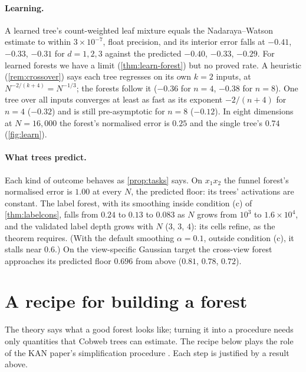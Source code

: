 \paragraph{Learning.}
A learned tree's count-weighted leaf mixture equals the Nadaraya--Watson
estimate to within $3\times10^{-7}$, float precision, and its interior error falls at $-0.41$,
$-0.33$, $-0.31$ for $d=1,2,3$ against the predicted $-0.40$, $-0.33$, $-0.29$.  For learned
forests we have a limit (\cref{thm:learn-forest}) but no proved rate.  A heuristic
(\cref{rem:crossover}) says each tree regresses on its own $k=2$ inputs, at
$N^{-2/(k+4)}=N^{-1/3}$; the forests follow it ($-0.36$ for $n=4$, $-0.38$ for $n=8$).  One tree
over all inputs converges at least as fast as its exponent $-2/(n+4)$ for $n=4$ ($-0.32$) and
is still pre-asymptotic for $n=8$ ($-0.12$).  In eight dimensions at $N=16{,}000$ the forest's
normalised error is $0.25$ and the single tree's $0.74$ (\cref{fig:learn}).

\paragraph{What trees predict.}
Each kind of outcome behaves as \cref{prop:tasks} says.  On $x_1x_2$ the funnel forest's
normalised error is $1.00$ at every $N$, the predicted floor: its trees' activations are
constant.  The label forest, with its smoothing inside condition (c) of \cref{thm:labelcons},
falls from $0.24$ to $0.13$ to $0.083$ as $N$ grows from $10^3$ to $1.6\times10^4$, and the
validated label depth grows with $N$ ($3$, $3$, $4$): its cells refine, as the theorem requires.
(With the default smoothing $\alpha=0.1$, outside condition (c), it stalls near $0.6$.)  On the
view-specific Gaussian target the cross-view forest approaches its predicted floor $0.696$ from
above ($0.81$, $0.78$, $0.72$).

\section{A recipe for building a forest}\label{sec:recipe}

The theory says what a good forest looks like; turning it into a procedure needs only
quantities that Cobweb trees can estimate.  The recipe below plays the role of the KAN
paper's simplification procedure \citep{liu2024kan}.  Each step is justified by a result
above.

